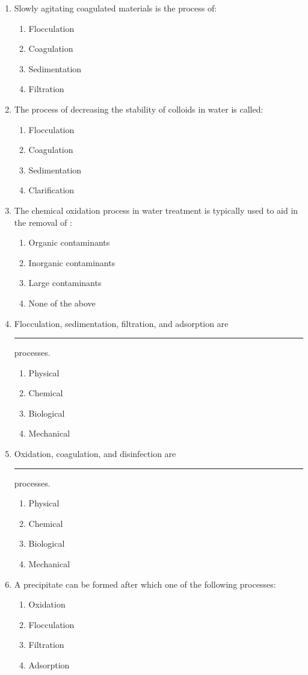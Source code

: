 \begin{enumerate}
\item Slowly agitating coagulated materials is the process of:
\begin{enumerate}
\item Flocculation
\item Coagulation
\item Sedimentation
\item Filtration
\end{enumerate}

\item The process of decreasing the stability of colloids in water is called:
\begin{enumerate}
\item Flocculation
\item Coagulation
\item Sedimentation
\item Clarification
\end{enumerate}

\item The chemical oxidation process in water treatment is typically used to aid in the
removal of :
\begin{enumerate}
\item Organic contaminants
\item Inorganic contaminants
\item Large contaminants
\item None of the above
\end{enumerate}

\item Flocculation, sedimentation, filtration, and adsorption are \rule{2cm}{0.3pt}
processes.
\begin{enumerate}
\item Physical
\item Chemical
\item Biological
\item Mechanical
\end{enumerate}

\item Oxidation, coagulation, and disinfection are \rule{2cm}{0.3pt} processes.
\begin{enumerate}
\item Physical
\item Chemical
\item Biological
\item Mechanical
\end{enumerate}

\item A precipitate can be formed after which one of the following processes:
\begin{enumerate}
\item Oxidation
\item Flocculation
\item Filtration
\item Adsorption
\end{enumerate}


\end{enumerate}
